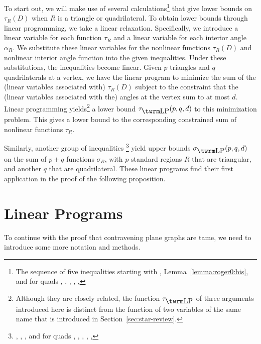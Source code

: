To start out, we will make use of several calculations\footnote{The
sequence of five inequalities starting with ,
Lemma~\ref{lemma:roger0:bis}, and for quads ,
, , ,
, }
that give lower bounds on $\tau_R(D)$ when $R$ is a triangle or
quadrilateral. To obtain lower bounds through linear programming,
we take a linear relaxation. Specifically, we introduce a linear
variable for each function $\tau_R$ and a linear variable for each
interior angle $\alpha_R$. We substitute these linear variables
for the nonlinear functions $\tau_R(D)$ and nonlinear interior
angle function into the given inequalities. Under these
substitutions, the inequalities become linear.   Given $p$
triangles and $q$ quadrilaterals at a vertex, we have the linear
program to minimize the sum of the (linear variables associated
with) $\tau_R(D)$ subject to the constraint that the (linear
variables associated with the)  angles at the vertex sum to at
most $d$. Linear programming yields\footnote{Although they are
closely related, the function $\tauLP$ of three arguments
introduced here is distinct from the function of two variables of
the same name that is introduced in
Section~\ref{sec:star-review}.} a lower bound $\tauLP(p,q,d)$ to
this minimization problem. This gives  a lower bound to the
corresponding constrained sum of nonlinear functions $\tau_R$.

Similarly, another group of inequalities%
\footnote{ , , , and
for quads , , ,
, , }
yield upper bounds $\sLP(p,q,d)$ on the sum of $p+q$ functions
$\sigma_R$, with $p$ standard regions $R$ that are triangular, and
another $q$ that are quadrilateral. These linear programs find
their first application in the proof of the following proposition.



\section{Linear Programs} %
\label{sec:2.2}  To continue with the proof that contravening
plane graphs are tame, we need to introduce some more notation and
methods.

